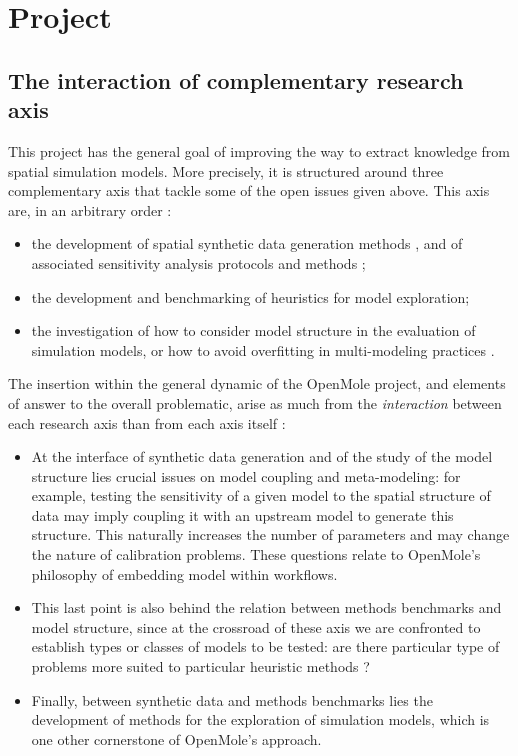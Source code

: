 \section{Project}


\subsection{The interaction of complementary research axis}

This project has the general goal of improving the way to extract knowledge from spatial simulation models. More precisely, it is structured around three complementary axis that tackle some of the open issues given above. This axis are, in an arbitrary order :
\begin{itemize}
\item the development of spatial synthetic data generation methods \cite{raimbault2016generation}, and of associated sensitivity analysis protocols and methods \cite{cottineau2017initial};
\item the development and benchmarking of heuristics for model exploration;
\item the investigation of how to consider model structure in the evaluation of simulation models, or how to avoid overfitting in multi-modeling practices \cite{raimbault2017indirect}.
\end{itemize}

The insertion within the general dynamic of the OpenMole project, and elements of answer to the overall problematic, arise as much from the \emph{interaction} between each research axis than from each axis itself : 

\begin{itemize}
\item At the interface of synthetic data generation and of the study of the model structure lies crucial issues on model coupling and meta-modeling: for example, testing the sensitivity of a given model to the spatial structure of data may imply coupling it with an upstream model to generate this structure. This naturally increases the number of parameters and may change the nature of calibration problems. These questions relate to OpenMole's philosophy of embedding model within workflows.
\item This last point is also behind the relation between methods benchmarks and model structure, since at the crossroad of these axis we are confronted to establish types or classes of models to be tested: are there particular type of problems more suited to particular heuristic methods ?
\item Finally, between synthetic data and methods benchmarks lies the development of methods for the exploration of simulation models, which is one other cornerstone of OpenMole's approach.
\end{itemize}


